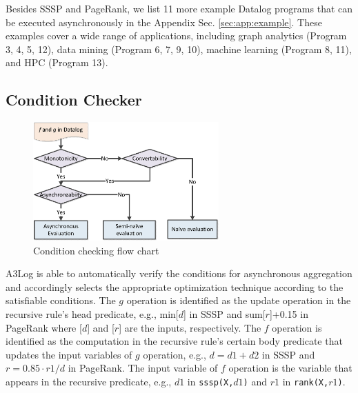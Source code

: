 \documentclass{vldb}
\begin{document}
Besides SSSP and PageRank, we list 11 more example Datalog programs that can be executed asynchronously in the Appendix Sec. \ref{sec:app:example}. These examples cover a wide range of applications, including graph analytics (Program 3, 4, 5, 12), data mining (Program 6, 7, 9, 10), machine learning (Program 8, 11), and HPC (Program 13).

\subsection{Condition Checker}
\label{sec:system:condition}

\begin{figure}[!t]
    \centering
  \includegraphics[width=2.8in]{fig/flow}
  \vspace{-0.1in}
  \caption{Condition checking flow chart}
  \label{fig:flow}
  \vspace{-0.2in}
\end{figure}

A3Log is able to automatically verify the conditions for asynchronous aggregation and accordingly selects the appropriate optimization technique according to the satisfiable conditions. The $g$ operation is identified as the update operation in the recursive rule's head predicate, e.g., min[$d$] in SSSP and sum[$r$]+0.15 in PageRank where [$d$] and [$r$] are the inputs, respectively. The $f$ operation is identified as the computation in the recursive rule's certain body predicate that updates the input variables of $g$ operation, e.g., $d=d1+d2$ in SSSP and $r=0.85\cdot r1/d$ in PageRank. The input variable of $f$ operation is the variable that appears in the recursive predicate, e.g., $d1$ in \texttt{sssp(X,$d1$)} and $r1$ in \texttt{rank(X,$r1$)}.
\end{document}
